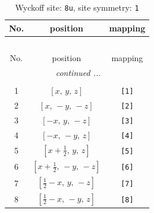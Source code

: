\documentclass[fleqn,8pt]{jsarticle}
\begin{document}
\renewcommand{\arraystretch}{1.2}
\begin{longtable}{ccc}
\caption{Wyckoff site: {\tt 8u}, site symmetry: {\tt 1}}
 \\
 \hline \hline
No. & position & mapping \\ \hline \endfirsthead

\multicolumn{2}{l}{\tablename\ \thetable{}} \\
 \hline \hline
No. & position & mapping \\ \hline \endhead

 \hline \hline
\multicolumn{2}{r}{\footnotesize\it continued ...} \\ \endfoot

 \hline \hline
\multicolumn{2}{r}{} \\ \endlastfoot

1 & $\left[ x,\, y,\, z \right]$ & {\tt [1]} \\ \hline
2 & $\left[ x,\, - y,\, - z \right]$ & {\tt [2]} \\ \hline
3 & $\left[ - x,\, y,\, - z \right]$ & {\tt [3]} \\ \hline
4 & $\left[ - x,\, - y,\, z \right]$ & {\tt [4]} \\ \hline
5 & $\left[ x + \frac{1}{2},\, y,\, z \right]$ & {\tt [5]} \\ \hline
6 & $\left[ x + \frac{1}{2},\, - y,\, - z \right]$ & {\tt [6]} \\ \hline
7 & $\left[ \frac{1}{2} - x,\, y,\, - z \right]$ & {\tt [7]} \\ \hline
8 & $\left[ \frac{1}{2} - x,\, - y,\, z \right]$ & {\tt [8]} \\
\end{longtable}
\end{document}
